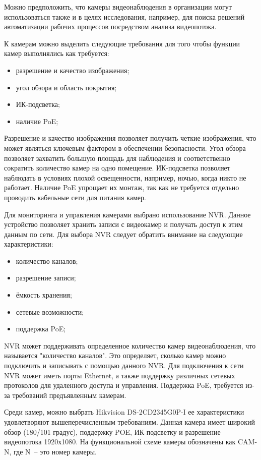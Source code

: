 Можно предположить, что камеры видеонаблюдения в организации могут использоваться также и в целях исследования, например, для 
поиска решений автоматизации рабочих процессов посредством анализа видеопотока.

К камерам можно выделить следующие требования для того чтобы функции камер выполнялись как требуется:

\begin{itemize}
    \item разрешение и качество изображения;
    \item угол обзора и область покрытия;
    \item ИК-подсветка;
    \item наличие PoE;
\end{itemize}

Разрешение и качество изображения позволяет получить четкие изображения, что может являться ключевым фактором в обеспечении безопасности. 
Угол обзора позволяет захватить большую площадь для наблюдения и соответственно сократить количество камер на одно помещение.
ИК-подсветка позволяет наблюдать в условиях плохой освещенности, например, ночью, когда никто не работает. Наличие PoE упрощает их
монтаж, так как не требуется отдельно проводить кабельные сети для питания камер.

Для мониторинга и управления камерами выбрано использование NVR. Данное устройство позволяет хранить записи с видеокамер и получать
доступ к этим данным по сети.
Для выбора NVR следует обратить внимание на следующие характеристики:

\begin{itemize}
    \item количество каналов;
    \item разрешение записи;
    \item ёмкость хранения;
    \item сетевые возможности;
    \item поддержка PoE;
\end{itemize}

NVR может поддерживать определенное количество камер видеонаблюдения, 
что называется "количество каналов". Это определяет, сколько камер можно подключить и 
записывать с помощью данного NVR. Для подключения к сети NVR может иметь порты Ethernet, а также 
поддержку различных сетевых протоколов для удаленного доступа и управления. Поддержка PoE, требуется 
из-за требований предъявленным камерам. 

Среди камер, можно выбрать Hikvision DS-2CD2345G0P-I ее характеристики удовлетворяют вышеперечисленным требованиям. Данная камера имеет широкий обзор (180/101 градус),
поддержку POE, ИК-подсветку и разрешение видеопотока 1920х1080. На функциональной схеме камеры обозначены как CAM-N, где N~-- это номер камеры.


